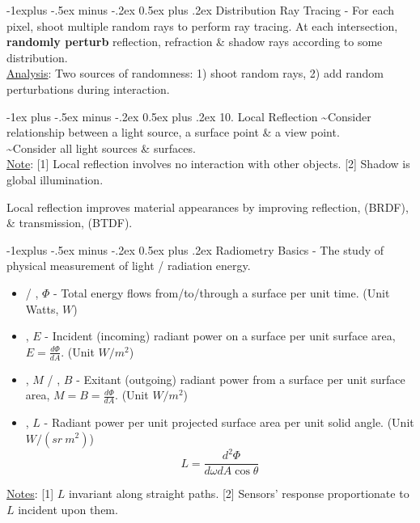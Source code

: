 \documentclass[10pt,landscape,letterpaper]{article}
\makeatletter
\renewcommand{\section}{\@startsection{section}{1}{0mm}%
                                {-1ex plus -.5ex minus -.2ex}%
                                {0.5ex plus .2ex}%
                                {\sffamily\large}}
\renewcommand{\subsection}{\@startsection{subsection}{2}{0mm}%
                                {-1explus -.5ex minus -.2ex}%
                                {0.5ex plus .2ex}%
                                {\sffamily\normalsize\itshape}}
\makeatother
\begin{document}
\begin{multicols}{3}
\subsection{Distribution Ray Tracing}
 - For each pixel, shoot multiple random rays to perform ray tracing. At each intersection, \textbf{randomly perturb} reflection, refraction \& shadow rays according to some distribution.
\\
\underline{Analysis}: Two sources of randomness: 1) shoot random rays, 2) add random perturbations during interaction.




\section{10. Local Reflection}
 \textasciitilde Consider relationship between a light source, a surface point \& a view point.
\\
 \textasciitilde Consider all light sources \& surfaces.
\\
\underline{Note}: [1] Local reflection involves no interaction with other objects. [2] Shadow is global illumination.

\smallskip

Local reflection improves material appearances by improving reflection,  (BRDF), \& transmission,  (BTDF).


\subsection{Radiometry Basics}
 - The study of physical measurement of light / radiation energy.
\begin{itemize}
    \item {} / , $\Phi$ - Total energy flows from/to/through a surface per unit time. (Unit Watts, $W$)
    \item {}, $E$ - Incident (incoming) radiant power on a surface per unit surface area, $E = \frac{d\Phi}{dA}$. (Unit $W / m^2$)
    \item {}, $M$ / , $B$ - Exitant (outgoing) radiant power from a surface per unit surface area, $M = B = \frac{d\Phi}{dA}$. (Unit $W/m^2$)
    \item {}, $L$ - Radiant power per unit projected surface area per unit solid angle. (Unit $W / (sr \ m^2)$)
    \[
    L = \frac{d^2\Phi}{d\omega dA\cos\theta}
    \]
\end{itemize}
\underline{Notes}: [1] $L$ invariant along straight paths. [2] Sensors' response proportionate to $L$ incident upon them.



\end{multicols}
\end{document}
